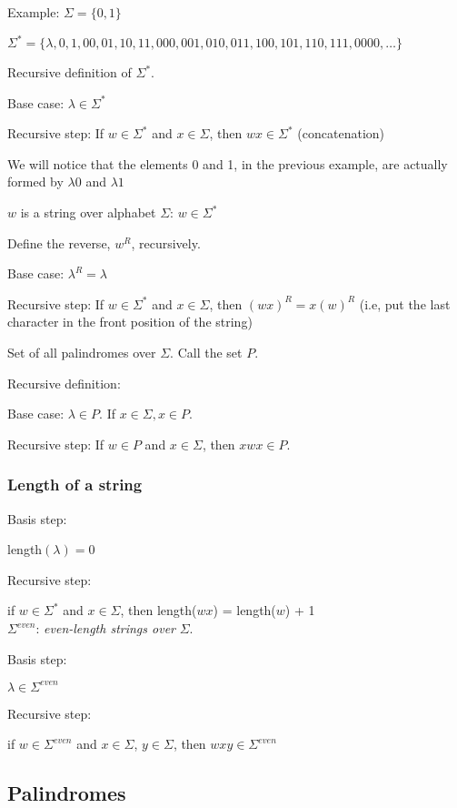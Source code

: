 \documentclass[english,openany]{book}
\begin{document}
    Example: $\Sigma = \{0,1\}$

    $\Sigma^* = \{\lambda, 0, 1, 00, 01, 10, 11, 000, 001, 010, 011, 100, 101, 110, 111, 0000, \dots \}$

    Recursive definition of $\Sigma^*$.

    Base case: $\lambda \in \Sigma^*$

    Recursive step: If $w \in \Sigma^*$ and $x \in \Sigma$, then $wx \in \Sigma^*$ (concatenation)

    We will notice that the elements 0 and 1, in the previous example, are actually formed by $\lambda0$ and $\lambda1$

    $w$ is a string over alphabet $\Sigma$: $w \in \Sigma^*$

    Define the reverse, $w^R$, recursively.

    Base case: $\lambda^R = \lambda$

    Recursive step: If $w \in \Sigma^*$ and $x \in \Sigma$, then $(wx)^R = x(w)^R$ (i.e, put the last character in the front position of the string)

    Set of all palindromes over $\Sigma$. Call the set $P$.

    Recursive definition:

    Base case: $\lambda \in P$. If $x \in \Sigma, x \in P$.

    Recursive step: If $w \in P$ and $x \in \Sigma$, then $xwx \in P$.

    \subsubsection{Length of a string}

    Basis step:

    length$(\lambda) = 0$

    Recursive step:

    if $w \in \Sigma^*$ and $x \in \Sigma$, then length($wx$) = length($w$) + 1\\


    $\Sigma^{even}$: \textit{even-length strings over} $\Sigma$.

    Basis step:

    $\lambda \in \Sigma^{even}$

    Recursive step:

    if $w \in \Sigma^{even}$ and $x \in \Sigma$, $y \in \Sigma$, then $wxy \in \Sigma^{even}$

    \subsection{Palindromes}
\end{document}
